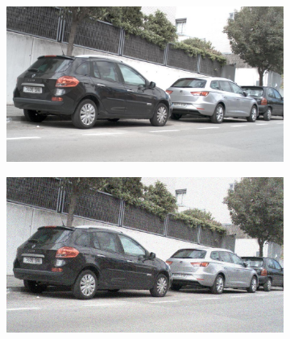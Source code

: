 \documentclass[a4paper]{ctexart}
\begin{document}
\begin{figure}[htbp]
\begin{subfigure}{0.08\textwidth}
			\label{fig：Gamma=0.9, Gauss Noise = 1.0}
		\end{subfigure} \\
		
		\vspace{-15pt}
		
		\begin{subfigure}{0.02\textwidth}
			\captionsetup{font=scriptsize}
			\caption*{}
			\vspace{-2pt}
		\end{subfigure}
		\begin{subfigure}{0.08\textwidth}
			\captionsetup{font=scriptsize}
			\includegraphics[width=\linewidth]{picture/Edge Detection/degrade/RGB_001 Gamma=1.0, Gauss Noise=0.0}
			\label{fig: Gamma=1.0, Gauss Noise = 0.0}
		\end{subfigure}
		\begin{subfigure}{0.08\textwidth}
			\captionsetup{font=scriptsize}
			\includegraphics[width=\linewidth]{picture/Edge Detection/degrade/RGB_001 Gamma=1.0, Gauss Noise=0.1}

\end{subfigure}
\end{figure}
\end{document}
